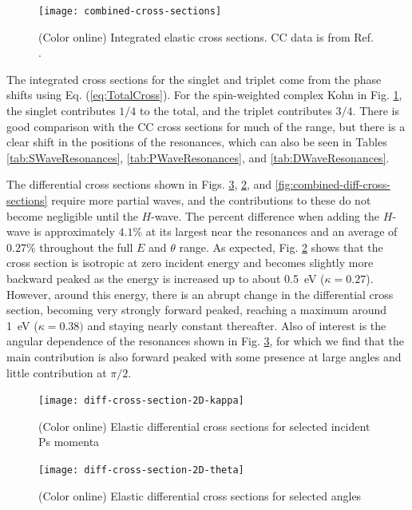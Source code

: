 \documentclass[preprint,showpacs,showkeys,preprintnumbers,amsmath,amssymb,longbibliography,pra,aps]{revtex4-1}
\begin{document}
\begin{figure}[H]
	\centering
	\texttt{[image: combined-cross-sections]}
	\caption{(Color online) Integrated elastic cross sections. CC data is from
Ref. \cite{Walters2004}.}
	\label{fig:combined-cross-sections}
\end{figure}

The integrated cross sections for the singlet and triplet come from the phase 
shifts using Eq. (\ref{eq:TotalCross}). For the spin-weighted complex Kohn in 
Fig. \ref{fig:combined-cross-sections}, the singlet contributes $1/4$ to the 
total, and the triplet contributes $3/4$. There is good comparison with the 
CC cross sections \cite{Walters2004} for much of the range, but there is a 
clear shift in the positions of the resonances, which can also be seen in 
Tables \ref{tab:SWaveResonances}, \ref{tab:PWaveResonances}, and
\ref{tab:DWaveResonances}.

The differential cross sections shown in Figs.
\ref{fig:diff-cross-section-2D-theta}, \ref{fig:diff-cross-section-2D-kappa},
and \ref{fig:combined-diff-cross-sections} require more partial waves, and
the contributions to these do 
not become negligible until the $H$-wave. The percent difference when adding 
the $H$-wave is approximately $4.1\%$ at its largest near the resonances and an 
average of $0.27\%$ throughout the full $E$ and $\theta$ range. As expected, 
Fig. \ref{fig:diff-cross-section-2D-kappa} shows that the cross section is 
isotropic at zero incident energy and becomes slightly more backward peaked 
as the energy is increased up to about \mbox{0.5 eV} ($\kappa = 0.27$). 
However, around this energy, there is an abrupt change in the differential 
cross section, becoming very strongly forward peaked, reaching a maximum 
around \mbox{1 eV} ($\kappa = 0.38)$ and staying nearly constant thereafter. 
Also of interest is the angular dependence of the resonances shown in Fig. 
\ref{fig:diff-cross-section-2D-theta}, for which we find that the main 
contribution is also forward peaked with some presence at large angles and 
little contribution at $\pi/2$.

\begin{figure}[H]
	\centering
	\texttt{[image: diff-cross-section-2D-kappa]}
	\caption{(Color online) Elastic differential cross sections for selected
incident Ps momenta}
	\label{fig:diff-cross-section-2D-kappa}
\end{figure}

\begin{figure}[H]
	\centering
	\texttt{[image: diff-cross-section-2D-theta]}
	\caption{(Color online) Elastic differential cross sections for selected
angles}
	\label{fig:diff-cross-section-2D-theta}
\end{figure}
\end{document}
